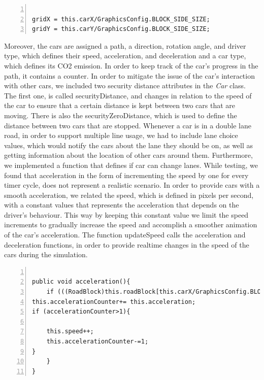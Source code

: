 \documentclass[oneside]{article}
\begin{document}
\begin{lstlisting}[numbers=left, numberstyle=\small, numbersep=8pt,  framexleftmargin=1pt, framexrightmargin=10pt ] 

gridX = this.carX/GraphicsConfig.BLOCK_SIDE_SIZE;
gridY = this.carY/GraphicsConfig.BLOCK_SIDE_SIZE;

\end{lstlisting}

\noindent Moreover, the cars are assigned a path, a direction, rotation angle, and driver type, which defines their speed, acceleration, and deceleration and a car type, which defines its CO2 emission. In order to keep track of the car's progress in the path, it contains a counter. In order to mitigate the issue of the car's interaction with other cars, we included two security distance attributes in the \textit{Car} class. The first one, is called securityDistance, and changes in relation to the speed of the car to ensure that a certain distance is kept between two cars that are moving. There is also the securityZeroDistance, which is used to define the distance between two cars that are stopped. Whenever a car is in a double lane road, in order to support multiple line usage, we had to include lane choice values, which would notify the cars about the lane they should be on, as well as getting information about the location of other cars around them. Furthermore, we implemented a function that defines if car can change lanes. While testing, we found that acceleration in the form of incrementing the speed by one for every timer cycle, does not represent a realistic scenario. In order to provide cars with a smooth acceleration, we related the speed, which is defined in pixels per second, with a constant values that represents the acceleration that depends on the driver's behaviour. This way by keeping this constant value we limit the speed increments to gradually increase the speed and accomplish a smoother animation of the car's acceleration. The function updateSpeed calls the acceleration and deceleration functions, in order to provide realtime changes in the speed of the cars during the simulation. 


\begin{lstlisting}[numbers=left, numberstyle=\small, numbersep=8pt,  framexleftmargin=1pt, framexrightmargin=10pt ] 

public void acceleration(){
	if (((RoadBlock)this.roadBlock[this.carX/GraphicsConfig.BLOCK_SIDE_SIZE][this.carY/GraphicsConfig.BLOCK_SIDE_SIZE]).getSpeedLimit()>this.speed){
this.accelerationCounter+= this.acceleration;
if (accelerationCounter>1){

	this.speed++;
	this.accelerationCounter-=1;
}
	}
}
\end{lstlisting}
\end{document}

